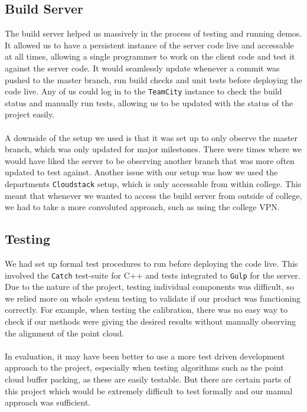 \documentclass{article}
\begin{document}
\subsection{Build Server}
The build server helped us massively in the process of testing and running demos. It allowed us to have a persistent instance of the server code live and accessable at all times, allowing a single programmer to work on the client code and test it against the server code. It would seamlessly update whenever a commit was pushed to the master branch, run build checks and unit tests before deploying the code live. Any of us could log in to the \texttt{TeamCity} \cite{teamcity} instance to check the build status and manually run tests, allowing us to be updated with the status of the project easily.
\\\\
A downside of the setup we used is that it was set up to only observe the master branch, which was only updated for major milestones. There were times where we would have liked the server to be observing another branch that was more often updated to test against. Another issue with our setup was how we used the departments \texttt{Cloudstack} \cite{cloudstack} setup, which is only accessable from within college. This meant that whenever we wanted to access the build server from outside of college, we had to take a more convoluted approach, such as using the college VPN.

\subsection{Testing}
We had set up formal test procedures to run before deploying the code live. This involved the \texttt{Catch} \cite{catch} test-suite for C++ and tests integrated to \texttt{Gulp} \cite{gulp} for the server. Due to the nature of the project, testing individual components was difficult, so we relied more on whole system testing to validate if our product was functioning correctly. For example, when testing the calibration, there was no easy way to check if our methods were giving the desired results without manually observing the alignment of the point cloud. 
\\\\
In evaluation, it may have been better to use a more test driven development approach to the project, especially when testing algorithms such as the point cloud buffer packing, as these are easily testable. But there are certain parts of this project which would be extremely difficult to test formally and our manual approach was sufficient. 
\end{document}
